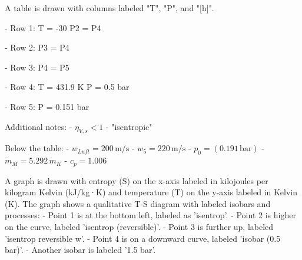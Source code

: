 A table is drawn with columns labeled "T", "P", and "[h]".  

- Row 1:  
  T = -30  
  P2 = P4  

- Row 2:  
  P3 = P4  

- Row 3:  
  P4 = P5  

- Row 4:  
  T = 431.9 K  
  P = 0.5 bar  

- Row 5:  
  P = 0.151 bar  

Additional notes:  
- \( \eta_{V,s} < 1 \)  
- "isentropic"  

Below the table:  
- \( w_{Luft} = 200 \, \text{m/s} \)  
- \( w_5 = 220 \, \text{m/s} \)  
- \( p_0 = (0.191 \, \text{bar}) \)  
- \( \dot{m}_M = 5.292 \, \dot{m}_K \)  
- \( c_p = 1.006 \)

A graph is drawn with entropy (S) on the x-axis labeled in kilojoules per kilogram Kelvin (kJ/kg·K) and temperature (T) on the y-axis labeled in Kelvin (K). The graph shows a qualitative T-S diagram with labeled isobars and processes:  
- Point 1 is at the bottom left, labeled as 'isentrop'.  
- Point 2 is higher on the curve, labeled 'isentrop (reversible)'.  
- Point 3 is further up, labeled 'isentrop reversible w'.  
- Point 4 is on a downward curve, labeled 'isobar (0.5 bar)'.  
- Another isobar is labeled '1.5 bar'.